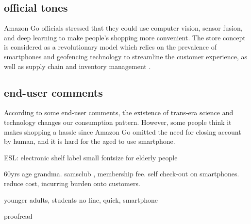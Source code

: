 \subsection{official tones}

Amazon Go officials stressed that they could use computer vision, sensor fusion, and deep learning to make people’s shopping more convenient.
The store concept is considered as a revolutionary model which relies on the prevalence of smartphones and geofencing technology to streamline the customer experience, as well as supply chain and inventory management\cite{GREWAL20171} .


\subsection{end-user comments}

According to some end-user comments, the existence of trans-era science and technology changes our consumption pattern. However, some people think it  makes shopping a hassle since Amazon Go omitted the need for closing account by human, and it is hard for the aged to use smartphone.

ESL: electronic shelf label
small fontsize for elderly people

60yrs age grandma.
samsclub , membership fee.  self check-out on smartphones.  reduce cost, incurring burden onto customers.

younger adults, students
no line, quick, smartphone 

proofread
